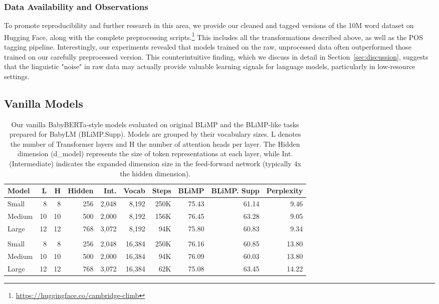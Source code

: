 \subsubsection{Data Availability and Observations}
To promote reproducibility and further research in this area, we provide our cleaned and tagged versions of the 10M word dataset on Hugging Face, along with the complete preprocessing scripts.\footnote{\url{https://huggingface.co/cambridge-climb}} This includes all the transformations described above, as well as the POS tagging pipeline. Interestingly, our experiments revealed that models trained on the raw, unprocessed data often outperformed those trained on our carefully preprocessed version. This counterintuitive finding, which we discuss in detail in Section~\ref{sec:discussion}, suggests that the linguistic "noise" in raw data may actually provide valuable learning signals for language models, particularly in low-resource settings.

\subsection{Vanilla Models}
\label{subsec:baseline}

\begin{table}
\centering
\small
\setlength{\tabcolsep}{4pt}  %
\begin{tabular}{l | rrrrr | rrrr}
\toprule
Model  & L & H & Hidden & Int. & Vocab & Steps & BLiMP & BLiMP. Supp & Perplexity \\
\midrule
Small  & 8 & 8 & 256 & 2,048   & 8,192   & 250K      & 75.43      & 61.14       & 9.46    \\
Medium & 10 & 10 & 500 & 2,000 & 8,192  & 156K      & 76.45      & 63.28        & 9.05  \\
Large  & 12 & 12 & 768 & 3,072 & 8,192   & 94K      & 75.80      & 60.83      & 9.34 \\[2mm]
\hline \\
Small  & 8 & 8 & 256 & 2,048   & 16,384  & 250K      & 76.16      & 60.85       & 13.80    \\
Medium & 10 & 10 & 500 & 2,000  & 16,384 & 94K      & 76.09      & 60.03        & 13.80     \\
Large  & 12 & 12 & 768 & 3,072 & 16,384  & 62K      & 75.08      & 63.45      & 14.22     \\
\bottomrule
\end{tabular}
\caption{\label{tbl:baseline-size-comparison} Our vanilla BabyBERTa-style models evaluated on original BLiMP and the BLiMP-like tasks prepared for BabyLM (BLiMP.Supp). Models are grouped by their vocabulary sizes. L denotes the number of Transformer layers and H the number of attention heads per layer. The Hidden dimension (d\_model) represents the size of token representations at each layer, while Int. (Intermediate) indicates the expanded dimension size in the feed-forward network (typically 4x the hidden dimension).}
\end{table}


